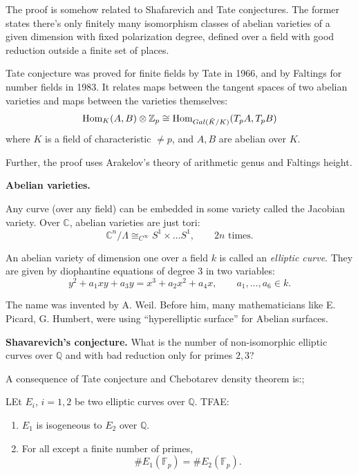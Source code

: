 \medskip\noindent
The proof is somehow related
to Shafarevich and Tate conjectures.
The former states there's only
finitely many isomorphism
classes of abelian varieties of a
given dimension with
fixed polarization degree, defined
over a field with
good reduction outside a finite set
of places.

Tate conjecture was proved for finite
fields by Tate in 1966,
and by Faltings for number fields
in 1983.
It relates maps between the tangent
spaces of two abelian varieties
and maps between the varieties
themselves:
$$
\mathop{\mathrm{Hom}}\nolimits_K(A,B) \otimes \mathbb{Z}_p
\cong
\mathop{\mathrm{Hom}}\nolimits_{Gal(\tilde{K}/K)}
(T_pA,T_pB)
$$
where $K$ is a field of characteristic
$\neq p$, and $A,B$ are abelian over $K$.

Further, the proof uses Arakelov's
theory of arithmetic genus
and Faltings height.

\medskip\noindent
{\bf Abelian varieties.} 

Any curve (over any field)
can be embedded in some variety
called the Jacobian variety.
Over $\mathbb{C}$,
abelian varieties are just tori:
$$
\mathbb{C}^n/\Lambda
\cong_{C^\infty}
S^1\times… S^1,\qquad  2n \text{ times}.
$$

An abelian variety of dimension one
over a field $k$ is called
an {\it elliptic curve}.
They are given by diophantine
equations of degree 3 in two variables:
$$
y^2+a_1xy+a_3y
=
x^3+a_2x^2+a_4x,
\qquad a_1,…,a_6 \in k.
$$

The name was invented by A. Weil.
Before him, many mathematicians like E.
Picard,
G. Humbert, were using ``hyperelliptic
surface'' for Abelian surfaces.

\medskip\noindent
{\bf Shavarevich's conjecture.} 
What is the number of non-isomorphic elliptic
curves over $\mathbb{Q}$ and with bad
reduction only for primes $2,3$?

\medskip\noindent
A consequence of Tate conjecture
and Chebotarev density theorem is:;

\begin{theorem}
\label{theorem-tate-chebot-consequence}
LEt $E_i$, $i=1,2$ be two
elliptic curves over $\mathbb{Q}$.
TFAE:
\begin{enumerate}
\item $E_1$ is isogeneous to $E_2$
over $\mathbb{Q}$.
\item For all except a finite number
of primes,
$$
\# E_1(\mathbb{F}_p)
=\# E_2(\mathbb{F}_p).
$$
\end{enumerate}
\end{theorem}

